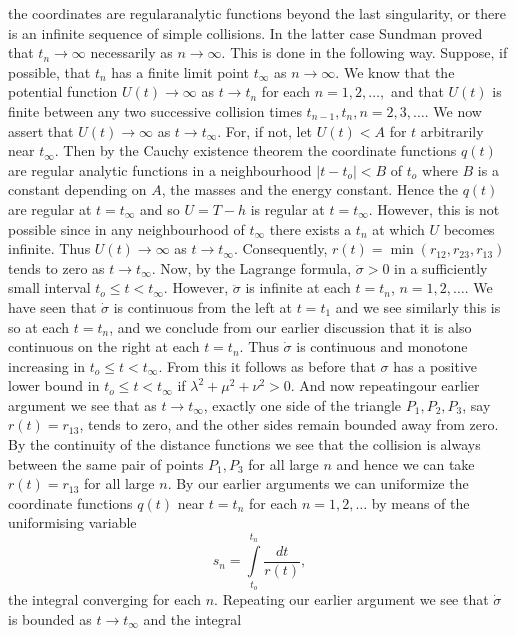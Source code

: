 the coordinates are regular\pageoriginale analytic functions beyond the last singularity, or there is an infinite sequence of simple collisions. In the latter case Sundman proved that $t_n \to \infty$ necessarily as $n \to \infty$. This is done in the following way. Suppose, if possible, that $t_n$ has a finite limit point $t_\infty$ as $n \to \infty$. We know that the potential function $U(t) \to \infty$ as $t \to t_n$ for each $n =1,2, \ldots ,$ and that $U(t)$ is finite between any two successive collision times $t_{n-1}, t_n, n=2,3, \ldots$. We now assert that $U(t) \to \infty$ as $t \to t_\infty$. For, if not, let $U(t) < A$ for $t$ arbitrarily near $t_\infty$. Then by the Cauchy existence theorem the coordinate functions $q(t)$ are regular analytic functions in a neighbourhood $|t-t_o| < B$ of $t_o$ where $B$ is a constant depending on $A$, the masses and the energy constant. Hence the $q(t)$ are regular at $t = t_\infty$ and so $U = T - h$ is regular at $t = t_\infty$. However, this is not possible since in any neighbourhood of $t_\infty$ there exists a $t_n$ at which $U$ becomes infinite. Thus $U(t) \to \infty$ as $t \to t_\infty$. Consequently, $r(t) = \min (r_{12}, r_{23}, r_{13})$ tends to zero as $t \to t_\infty$. Now, by the Lagrange formula, $\ddot{\sigma} > 0$ in a sufficiently small interval $t_o \leq t < t_\infty$. However, $\ddot{\sigma}$ is infinite at each $t = t_n$, $n =1,2,\ldots$. We have seen that $\dot{\sigma}$ is continuous from the left at $t = t_1$ and we see similarly this is so at each $t = t_n$, and we conclude from our earlier discussion that it is also continuous on the right at each $t =t_n$. Thus $\dot{\sigma}$ is continuous and monotone increasing in $t_o \leq t < t_\infty$. From this it follows as before that $\sigma$ has a positive lower bound in $t_o \leq t < t_\infty$ if $\lambda^2+ \mu^2 + \nu^2 > 0$. And now repeating\pageoriginale our earlier argument we see that as $t \to t_\infty$, exactly one side of the triangle $P_1, P_2, P_3$, say $r(t) = r_{13}$, tends to zero, and the other sides remain bounded away from zero. By the continuity of the distance functions we see that the collision is always between the same pair of points $P_1 , P_3$ for all large $n$ and hence we can take $r(t) = r_{13}$ for all large $n$. By our earlier arguments we can uniformize the coordinate functions $q(t)$ near $t = t_n$ for each $n =1,2, \ldots$ by means of the uniformising variable
$$
s_n = \int\limits^{t_n}_{t_o} \frac{dt}{r(t)},
$$
the integral converging for each $n$. Repeating our earlier argument we see that $\dot{\sigma}$ is bounded as $t \to t_\infty$ and the integral
